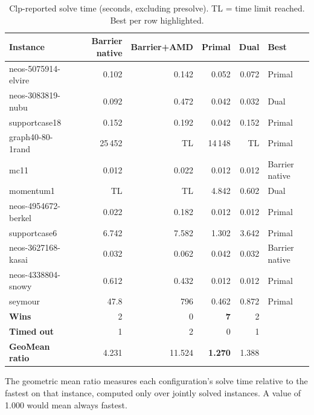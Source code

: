 \documentclass[11pt,a4paper]{article}
\begin{document}
\begin{table}[h]
\centering
\caption{Clp-reported solve time (seconds, excluding presolve). TL = time
         limit reached. Best per row highlighted.}
\label{tab:solvetime}
\setlength{\tabcolsep}{5pt}
\begin{tabular}{@{}lrrrrl@{}}
\toprule
\textbf{Instance}
  & \textbf{Barrier native}
  & \textbf{Barrier+AMD}
  & \textbf{Primal}
  & \textbf{Dual}
  & \textbf{Best} \\
\midrule
neos-5075914-elvire  & 0.102 & 0.142 & \cellcolor{bestcell}0.052 & 0.072 & Primal \\
neos-3083819-nubu    & 0.092 & 0.472 & 0.042 & \cellcolor{bestcell}0.032 & Dual \\
supportcase18        & 0.152 & 0.192 & \cellcolor{bestcell}0.042 & 0.152 & Primal \\
graph40-80-1rand     & 25\,452 & \cellcolor{tlcell}TL & \cellcolor{bestcell}14\,148 & \cellcolor{tlcell}TL & Primal \\
mc11                 & \cellcolor{bestcell}0.012 & 0.022 & 0.012 & 0.012 & Barrier native \\
momentum1            & \cellcolor{tlcell}TL & \cellcolor{tlcell}TL & 4.842 & \cellcolor{bestcell}0.602 & Dual \\
neos-4954672-berkel  & 0.022 & 0.182 & \cellcolor{bestcell}0.012 & 0.012 & Primal \\
supportcase6         & 6.742 & 7.582 & \cellcolor{bestcell}1.302 & 3.642 & Primal \\
neos-3627168-kasai   & \cellcolor{bestcell}0.032 & 0.062 & 0.042 & 0.032 & Barrier native \\
neos-4338804-snowy   & 0.612 & 0.432 & \cellcolor{bestcell}0.012 & 0.012 & Primal \\
seymour              & 47.8 & 796 & \cellcolor{bestcell}0.462 & 0.872 & Primal \\
\midrule
\textbf{Wins}        & 2 & 0 & \textbf{7} & 2 & \\
\textbf{Timed out}   & 1 & 2 & 0 & 1 & \\
\textbf{GeoMean ratio} & 4.231 & 11.524 & \cellcolor{bestcell}\textbf{1.270} & 1.388 & \\
\bottomrule
\end{tabular}
\end{table}

\noindent The geometric mean ratio measures each configuration's solve time
relative to the fastest on that instance, computed only over jointly solved
instances.  A value of 1.000 would mean always fastest.
\end{document}
